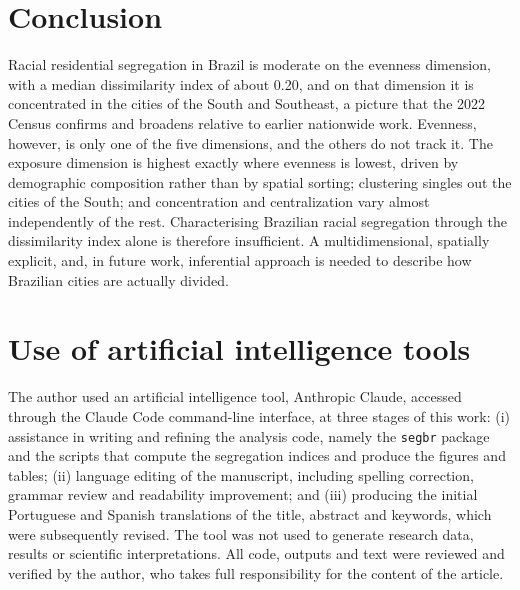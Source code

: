 \documentclass[12pt,a4paper]{article}
\begin{document}
\section{Conclusion}\label{sec:conclusion}

Racial residential segregation in Brazil is moderate on the evenness dimension, with a median dissimilarity index of about 0.20, and on that dimension it is concentrated in the cities of the South and Southeast, a picture that the 2022 Census confirms and broadens relative to earlier nationwide work. Evenness, however, is only one of the five dimensions, and the others do not track it. The exposure dimension is highest exactly where evenness is lowest, driven by demographic composition rather than by spatial sorting; clustering singles out the cities of the South; and concentration and centralization vary almost independently of the rest. Characterising Brazilian racial segregation through the dissimilarity index alone is therefore insufficient. A multidimensional, spatially explicit, and, in future work, inferential approach is needed to describe how Brazilian cities are actually divided.

\section*{Use of artificial intelligence tools}

The author used an artificial intelligence tool, Anthropic Claude, accessed through the Claude Code command-line interface, at three stages of this work: (i) assistance in writing and refining the analysis code, namely the \texttt{segbr} package and the scripts that compute the segregation indices and produce the figures and tables; (ii) language editing of the manuscript, including spelling correction, grammar review and readability improvement; and (iii) producing the initial Portuguese and Spanish translations of the title, abstract and keywords, which were subsequently revised. The tool was not used to generate research data, results or scientific interpretations. All code, outputs and text were reviewed and verified by the author, who takes full responsibility for the content of the article.



\end{document}
